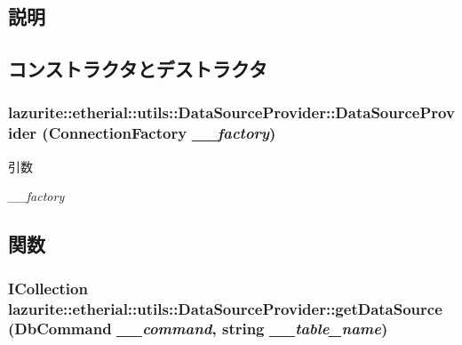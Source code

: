 \subsection{説明}


\subsection{コンストラクタとデストラクタ}
\hypertarget{classlazurite_1_1etherial_1_1utils_1_1_data_source_provider_ab3d9bd0b30a730aa08e1aca8d5bea1b9}{
\subsubsection[{DataSourceProvider}]{\setlength{\rightskip}{0pt plus 5cm}lazurite::etherial::utils::DataSourceProvider::DataSourceProvider ({\bf ConnectionFactory} {\em \_\-\_\-factory})}}
\label{classlazurite_1_1etherial_1_1utils_1_1_data_source_provider_ab3d9bd0b30a730aa08e1aca8d5bea1b9}

\begin{DoxyParams}{引数}
\item[{\em \_\-\_\-factory}]\end{DoxyParams}


\subsection{関数}
\hypertarget{classlazurite_1_1etherial_1_1utils_1_1_data_source_provider_aab623559257d968b2bd096dee9233a4b}{
\subsubsection[{getDataSource}]{\setlength{\rightskip}{0pt plus 5cm}ICollection lazurite::etherial::utils::DataSourceProvider::getDataSource (DbCommand {\em \_\-\_\-command}, \/  string {\em \_\-\_\-table\_\-name})}}
\label{classlazurite_1_1etherial_1_1utils_1_1_data_source_provider_aab623559257d968b2bd096dee9233a4b}

